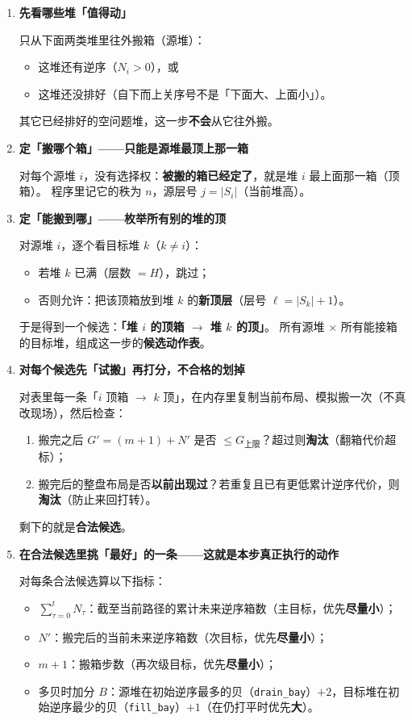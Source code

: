 \documentclass[11pt,a4paper]{ctexart}
\newcommand{\capG}{G_{\mathrm{上限}}}
\begin{document}
\begin{enumerate}[label=\textbf{第 \arabic* 步}, leftmargin=2.2em]

  \item \textbf{先看哪些堆「值得动」}

  只从下面两类堆里往外搬箱（源堆）：
  \begin{itemize}
    \item 这堆还有逆序（$N_i>0$），或
    \item 这堆还没排好（自下而上关序号不是「下面大、上面小」）。
  \end{itemize}
  其它已经排好的空问题堆，这一步\textbf{不会}从它往外搬。

  \item \textbf{定「搬哪个箱」——只能是源堆最顶上那一箱}

  对每个源堆 $i$，没有选择权：\textbf{被搬的箱已经定了}，就是堆 $i$ 最上面那一箱（顶箱）。
  程序里记它的秩为 $n$，源层号 $j=|S_i|$（当前堆高）。

  \item \textbf{定「能搬到哪」——枚举所有别的堆的顶}

  对源堆 $i$，逐个看目标堆 $k$（$k\neq i$）：
  \begin{itemize}
    \item 若堆 $k$ 已满（层数 $=H$），跳过；
    \item 否则允许：把该顶箱放到堆 $k$ 的\textbf{新顶层}（层号 $\ell=|S_k|+1$）。
  \end{itemize}
  于是得到一个候选：\textbf{「堆 $i$ 的顶箱 $\to$ 堆 $k$ 的顶」}。
  所有源堆 $\times$ 所有能接箱的目标堆，组成这一步的\textbf{候选动作表}。

  \item \textbf{对每个候选先「试搬」再打分，不合格的划掉}

  对表里每一条「$i$ 顶箱 $\to$ $k$ 顶」，在内存里复制当前布局、模拟搬一次（不真改现场），然后检查：
  \begin{enumerate}[label=(\alph*)]
    \item 搬完之后 $G' = (m+1) + N'$ 是否 $\le \capG$？超过则\textbf{淘汰}（翻箱代价超标）；
    \item 搬完后的整盘布局是否\textbf{以前出现过}？若重复且已有更低累计逆序代价，则\textbf{淘汰}（防止来回打转）。
  \end{enumerate}
  剩下的就是\textbf{合法候选}。

  \item \textbf{在合法候选里挑「最好」的一条——这就是本步真正执行的动作}

  对每条合法候选算以下指标：
  \begin{itemize}
    \item $\sum_{\tau=0}^{t}N_\tau$：截至当前路径的累计未来逆序箱数（主目标，优先\textbf{尽量小}）；
    \item $N'$：搬完后的当前未来逆序箱数（次目标，优先\textbf{尽量小}）；
    \item $m+1$：搬箱步数（再次级目标，优先\textbf{尽量小}）；
    \item 多贝时加分 $B$：源堆在初始逆序最多的贝（\texttt{drain\_bay}）$+2$，目标堆在初始逆序最少的贝（\texttt{fill\_bay}）$+1$（在仍打平时优先\textbf{大}）。
  \end{itemize}


\end{enumerate}
\end{document}
